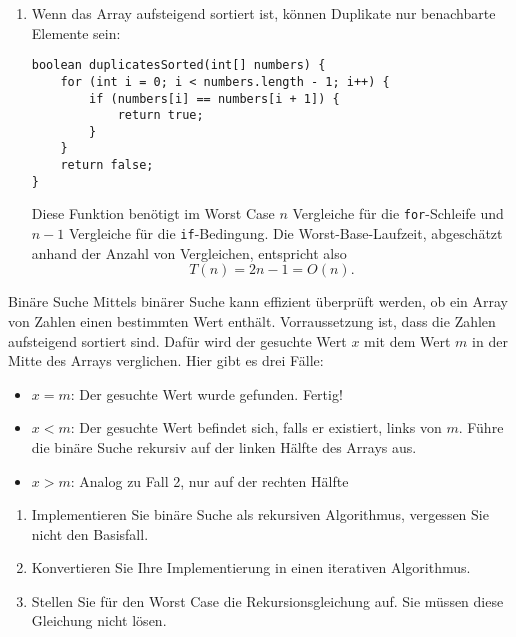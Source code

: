 \documentclass[11pt,a4paper]{article}
\begin{document}
\begin{loesung}
\begin{enumerate}
    \item Wenn das Array aufsteigend sortiert ist, können Duplikate nur benachbarte Elemente sein:\\
\begin{minipage}{\linewidth}
\begin{lstlisting}
boolean duplicatesSorted(int[] numbers) {
    for (int i = 0; i < numbers.length - 1; i++) {
        if (numbers[i] == numbers[i + 1]) {
            return true;
        }
    }
    return false;
}
\end{lstlisting}
\end{minipage}
Diese Funktion benötigt im Worst Case $n$ Vergleiche für die \texttt{for}-Schleife und $n - 1$ Vergleiche für die \texttt{if}-Bedingung.
Die Worst-Base-Laufzeit, abgeschätzt anhand der Anzahl von Vergleichen, entspricht also
\begin{equation}
    T(n) = 2n - 1 = O(n).
\end{equation}

\end{enumerate}
\end{loesung}


\begin{aufgabe}{3}{Binäre Suche}
Mittels binärer Suche kann effizient überprüft werden, ob ein Array von Zahlen einen bestimmten Wert enthält.
Vorraussetzung ist, dass die Zahlen aufsteigend sortiert sind.
Dafür wird der gesuchte Wert $x$ mit dem Wert $m$ in der Mitte des Arrays verglichen. Hier gibt es drei Fälle:
\vspace{-3mm}
\begin{itemize}
    \item $x = m$: Der gesuchte Wert wurde gefunden. Fertig!
    \item $x < m$: Der gesuchte Wert befindet sich, falls er existiert, links von $m$. Führe die binäre Suche rekursiv auf der linken Hälfte des Arrays aus.
    \item $x > m$: Analog zu Fall 2, nur auf der rechten Hälfte
\end{itemize}
\begin{enumerate}
    \item Implementieren Sie binäre Suche als rekursiven Algorithmus, vergessen Sie nicht den Basisfall.
    \item Konvertieren Sie Ihre Implementierung in einen iterativen Algorithmus.
    \item Stellen Sie für den Worst Case die Rekursionsgleichung auf. Sie müssen diese Gleichung nicht lösen.
\end{enumerate}
    
\end{aufgabe}
\end{document}
